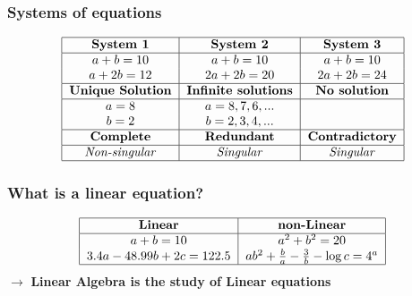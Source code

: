 \documentclass[12pt,a4paper]{article}
\begin{document}
\subsubsection{Systems of equations}
\begin{align*}
    \begin{tabular}{|c|c|c|}
        \hline
        \textbf{System 1}        & \textbf{System 2}           & \textbf{System 3}      \\
        \hline
        $a + b = 10$             & $a + b = 10$                & $a + b = 10$           \\
        $a + 2b = 12$            & $2a + 2b = 20$              & $2a + 2b = 24$         \\
        \hline
        \textbf{Unique Solution} & \textbf{Infinite solutions} & \textbf{No solution}   \\
        \hline
        $a = 8$                  & $a=8,7,6,...$               &                        \\
        $b = 2$                  & $b=2,3,4,...$               &                        \\
        \hline
        \textbf{Complete}        & \textbf{Redundant}          & \textbf{Contradictory} \\
        \hline
        \textit{Non-singular}    & \textit{Singular}           & \textit{Singular}      \\
        \hline
    \end{tabular}
\end{align*}


\subsubsection{What is a linear equation?}
\begin{align*}
    \begin{tabular}{|c|c|}
        \hline
        \textbf{Linear}            & \textbf{non-Linear}                                \\
        \hline
        $a + b = 10$               & $a^2 + b^2 = 20$                                   \\
        $3.4a - 48.99b+2c = 122.5$ & $ab^2 + \frac{b}{a} - \frac{3}{b} - \log{c} = 4^a$ \\
        \hline
    \end{tabular}
\end{align*}
$\rightarrow$ \textbf{Linear Algebra is the study of Linear equations}
\end{document}
